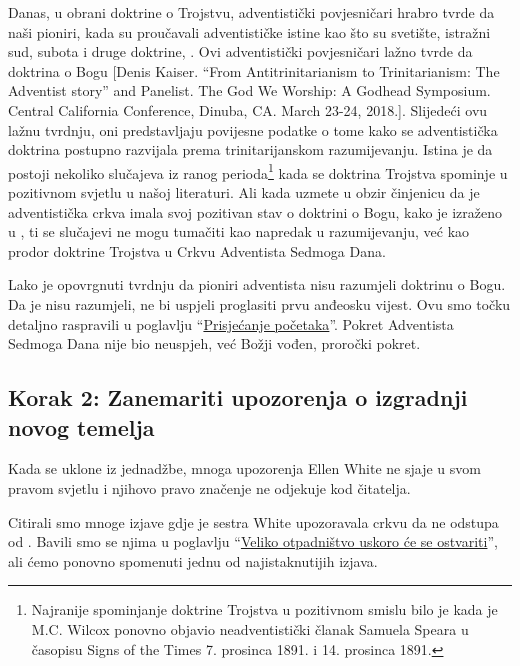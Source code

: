Danas, u obrani doktrine o Trojstvu, adventistički povjesničari hrabro tvrde da naši pioniri, kada su proučavali adventističke istine kao što su svetište, istražni sud, subota i druge doktrine, . Ovi adventistički povjesničari lažno tvrde da doktrina o Bogu [Denis Kaiser. “From Antitrinitarianism to Trinitarianism: The Adventist story” and Panelist. The God We Worship: A Godhead Symposium. Central California Conference, Dinuba, CA. March 23-24, 2018.]. Slijedeći ovu lažnu tvrdnju, oni predstavljaju povijesne podatke o tome kako se adventistička doktrina postupno razvijala prema trinitarijanskom razumijevanju. Istina je da postoji nekoliko slučajeva iz ranog perioda\footnote{Najranije spominjanje doktrine Trojstva u pozitivnom smislu bilo je kada je M.C. Wilcox ponovno objavio neadventistički članak Samuela Speara u časopisu Signs of the Times 7. prosinca 1891. i 14. prosinca 1891.} kada se doktrina Trojstva spominje u pozitivnom svjetlu u našoj literaturi. Ali kada uzmete u obzir činjenicu da je adventistička crkva imala svoj pozitivan stav o doktrini o Bogu, kako je izraženo u , ti se slučajevi ne mogu tumačiti kao napredak u razumijevanju, već kao prodor doktrine Trojstva u Crkvu Adventista Sedmoga Dana.

Lako je opovrgnuti tvrdnju da pioniri adventista nisu razumjeli doktrinu o Bogu. Da je nisu razumjeli, ne bi uspjeli proglasiti prvu anđeosku vijest. Ovu smo točku detaljno raspravili u poglavlju “\hyperref[chap:remembering-the-beginning]{Prisjećanje početaka}”. Pokret Adventista Sedmoga Dana nije bio neuspjeh, već Božji vođen, proročki pokret.

\subsection*{Korak 2: Zanemariti upozorenja o izgradnji novog temelja}

Kada se  uklone iz jednadžbe, mnoga upozorenja Ellen White ne sjaje u svom pravom svjetlu i njihovo pravo značenje ne odjekuje kod čitatelja.

Citirali smo mnoge izjave gdje je sestra White upozoravala crkvu da ne odstupa od . Bavili smo se njima u poglavlju “\hyperref[chap:apostasy]{Veliko otpadništvo uskoro će se ostvariti}”, ali ćemo ponovno spomenuti jednu od najistaknutijih izjava.

